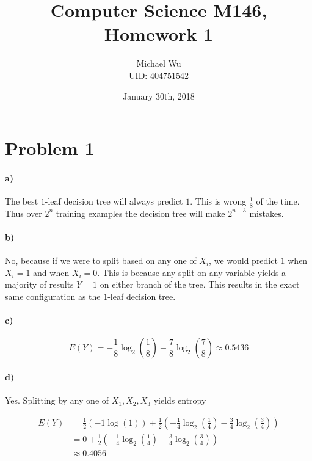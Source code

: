 \documentclass[12pt]{article}
\begin{document}
\title{Computer Science M146, Homework 1}
\date{January 30th, 2018}
\author{Michael Wu\\UID: 404751542}
\maketitle

\section*{Problem 1}

\paragraph{a)}

The best \(1\)-leaf decision tree will always predict \(1\). This is wrong \(\frac{1}{8}\) of the time. Thus over \(2^n\) training examples
the decision tree will make \(2^{n-3}\) mistakes.

\paragraph{b)}

No, because if we were to split based on any one of \(X_i\), we would predict \(1\) when \(X_i=1\) and when \(X_i=0\). This is because any split
on any variable yields a majority of results \(Y=1\) on either branch of the tree. This results in the exact same configuration as the \(1\)-leaf
decision tree.

\paragraph{c)}

\[E(Y)=-\frac{1}{8}\log_2\left(\frac{1}{8}\right)-\frac{7}{8}\log_2\left(\frac{7}{8}\right)\approx 0.5436\]

\paragraph{d)}

Yes. Splitting by any one of \(X_1,X_2,X_3\) yields entropy

\begin{align*}
        E(Y)&=\frac{1}{2}(-1\log(1))+\frac{1}{2}\left(-\frac{1}{4}\log_2\left(\frac{1}{4}\right)-\frac{3}{4}\log_2\left(\frac{3}{4}\right)\right)\\
        &=0+\frac{1}{2}\left(-\frac{1}{4}\log_2\left(\frac{1}{4}\right)-\frac{3}{4}\log_2\left(\frac{3}{4}\right)\right)\\
        &\approx 0.4056
\end{align*}
\end{document}

